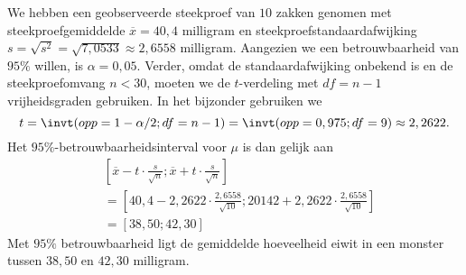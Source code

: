 \begin{enumerate}[label=(\alph*)]
{        We hebben een geobserveerde steekproef van $10$ zakken genomen met steekproefgemiddelde $\overline{x} = 40,4$ milligram en steekproefstandaardafwijking $s = \sqrt{s^2} = \sqrt{7,0533} \approx 2,6558$ milligram. 
        Aangezien we een betrouwbaarheid van $95\%$ willen, is $\alpha = 0,05$.
        Verder, omdat de standaardafwijking onbekend is en de steekproefomvang $n < 30$, moeten we de $t$-verdeling met $df=n-1$ vrijheidsgraden gebruiken.
        In het bijzonder gebruiken we
        \[
            t = \invt(opp=1-\alpha/2; df=n-1) = \invt(opp=0,975; df=9) \approx 2,2622.
        \]
        Het $95\%$-betrouwbaarheidsinterval voor $\mu$ is dan gelijk aan 
        \begin{align*}
            &[\overline{x} - t \cdot \frac{s}{\sqrt{n}}; \overline{x} + t \cdot \frac{s}{\sqrt{n}}] \\
            &=[40,4 - 2,2622 \cdot \frac{2,6558}{\sqrt{10}}; 20142 + 2,2622 \cdot \frac{2,6558}{\sqrt{10}}] \\
            &=[38,50; 42,30]
        \end{align*}
        Met $95\%$ betrouwbaarheid ligt de gemiddelde hoeveelheid eiwit in een monster tussen $38,50$ en $42,30$ milligram.
    }
\end{enumerate}
